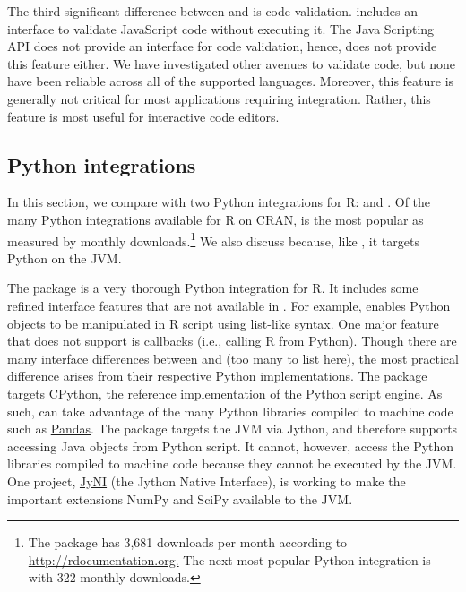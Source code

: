 The third significant difference between  and  is code validation.  includes an interface to validate JavaScript code without executing it. The Java Scripting API does not provide an interface for code validation, hence,  does not provide this feature either. We have investigated other avenues to validate code, but none have been reliable across all of the supported languages. Moreover, this feature is generally not critical for most applications requiring integration. Rather, this feature is most useful for interactive code editors.

\subsection{Python integrations}

In this section, we compare  with two Python integrations for R:  and . Of the many Python integrations available for R on CRAN,  is the most popular as measured by monthly downloads.\footnote{The  package has 3,681 downloads per month according to \href{http://rdocumentation.org}{http://rdocumentation.org.} The next most popular Python integration is  with 322 monthly downloads.} We also discuss  because, like , it targets Python on the JVM.

The  package is a very thorough Python integration for R. It includes some refined interface features that are not available in . For example,  enables Python objects to be manipulated in R script using list-like syntax. One major  feature that  does not support is callbacks (i.e., calling R from Python). Though there are many interface differences between  and  (too many to list here), the most practical difference arises from their respective Python implementations. The  package targets CPython, the reference implementation of the Python script engine. As such,  can take advantage of the many Python libraries compiled to machine code such as \href{https://pandas.pydata.org/}{Pandas}. The  package targets the JVM via Jython, and therefore supports accessing Java objects from Python script. It cannot, however, access the Python libraries compiled to machine code because they cannot be executed by the JVM. One project, \href{http://www.jyni.org/}{JyNI} (the Jython Native Interface), is working to make the important extensions NumPy and SciPy available to the JVM. %

